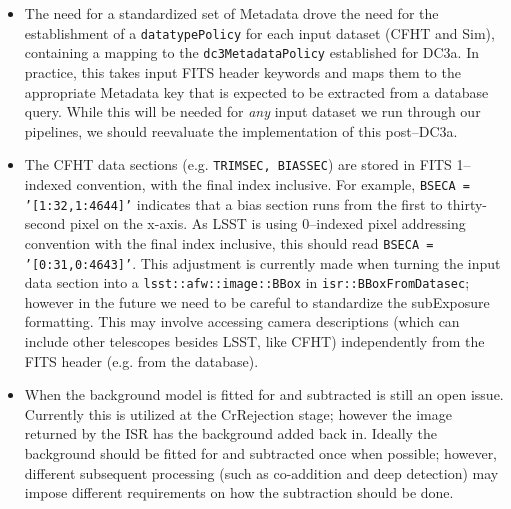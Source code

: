 \begin{itemize}

\item The need for a standardized set of Metadata drove the need for the 
establishment of a {\tt datatypePolicy} for each input dataset (CFHT
and Sim), containing a mapping to the {\tt dc3MetadataPolicy}
established for DC3a.  In practice, this takes input FITS header
keywords and maps them to the appropriate Metadata key that is
expected to be extracted from a database query.  While this will be
needed for {\it any} input dataset we run through our pipelines, we
should reevaluate the implementation of this post--DC3a.

\item The CFHT data sections (e.g. {\tt TRIMSEC, BIASSEC}) are stored
in FITS 1--indexed convention, with the final index inclusive.  For
example, {\tt BSECA = '[1:32,1:4644]'} indicates that a bias section
runs from the first to thirty-second pixel on the x-axis.  As LSST is
using 0--indexed pixel addressing convention with the final index
inclusive, this should read {\tt BSECA = '[0:31,0:4643]'}.  This
adjustment is currently made when turning the input data section into
a {\tt lsst::afw::image::BBox} in {\tt isr::BBoxFromDatasec}; however
in the future we need to be careful to standardize the subExposure
formatting.  This may involve accessing camera descriptions (which can
include other telescopes besides LSST, like CFHT) independently from
the FITS header (e.g. from the database).  

\item When the background model is fitted for and 
subtracted is still an open issue.  Currently this is utilized at the
CrRejection stage; however the image returned by the ISR has the
background added back in.  Ideally the background should be fitted for
and subtracted once when possible; however, different subsequent
processing (such as co-addition and deep detection) may impose
different requirements on how the subtraction should be done. 


\end{itemize}
